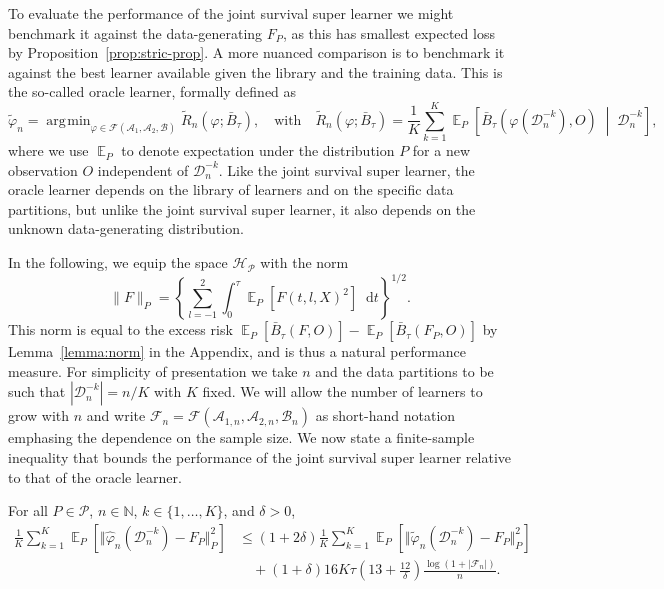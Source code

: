 \documentclass[lineno]{biometrika}
\DeclareMathOperator{\E}{\mathbb{E}} %
\newcommand{\N}{\mathbb{N}}
\renewcommand{\phi}{\varphi}
\newcommand*\diff{\mathop{}\!\mathrm{d}}
\newcommand{\midd}{\; \middle|\;}
\newcommand{\1}{\mathds{1}}
\DeclareMathOperator*{\argmin}{\arg\!\min}
\newcommand{\data}{\ensuremath{\mathcal{D}}}
\begin{document}
To evaluate the performance of the joint survival super learner we
might benchmark it against the data-generating \( F_P \), as this has
smallest expected loss by Proposition~\ref{prop:stric-prop}. A more
nuanced comparison is to benchmark it against the best learner
available given the library and the training data. This is the
so-called oracle learner, formally defined as
\begin{equation*}
  \tilde{\phi}_n
  =  \argmin_{\phi \in \mathcal{F}(\mathcal{A}_1, \mathcal{A}_2, \mathcal{B}) }
  \tilde{R}_{n}(\phi ; \bar{B}_{\tau}),
  \quad \text{with} \quad 
  \tilde{R}_n(\phi; \bar{B}_{\tau})=
  \frac{1}{K}\sum_{k=1}^{K} 
  \E_P{
    \left[
      \bar{B}_{\tau}
      {
        \left(
          \phi{ (\data_n^{-k})}
          , O
        \right)
      } 
      \midd  \data_n^{-k}
    \right]}
  ,
\end{equation*}
where %
we use \( \E_P \) to denote expectation under the distribution \( P \)
for a new observation \( O \) independent of \( \data_n^{-k} \). Like
the joint survival super learner, the oracle learner depends on the library of learners and on the
specific data partitions, but unlike the joint survival super learner, it also depends on the
unknown data-generating distribution.

In the following, we equip the space \( \mathcal{H}_{\mathcal{P}} \)
with the norm
\begin{equation}
  \label{eq:norm}
  \| F \|_{P} = 
  \left\{
    \sum_{l=-1}^{2}
    \int_0^{\tau} \E_P{\left[ F(t, l, X)^2 \right]} \diff t
  \right\}^{1/2}.
\end{equation}
This norm is equal to the excess risk
\( \E_P{[\bar{B}_\tau(F, O)]} - \E_P{[\bar{B}_\tau(F_P, O)]} \) by
Lemma~\ref{lemma:norm} in the Appendix, and is thus a natural
performance measure. For simplicity of presentation we take \( n \)
and the data partitions to be such that \( |\data_n^{-k}| = n/K \)
with \( K \) fixed. We will allow the number of learners to grow with
\( n \) and write
\( \mathcal{F}_n=\mathcal{F}(\mathcal{A}_{1,n}, \mathcal{A}_{2,n},
\mathcal{B}_n)\) as short-hand notation emphasing the dependence on
the sample size.  We now state a finite-sample inequality that bounds
the performance of the joint survival super learner relative to that of the oracle learner.

\begin{proposition}
  \label{prop:oracle-prop}
  For all \(P\in\mathcal{P}\), \( n \in \N \), \( k \in \{1, \dots, K\} \),
  and $\delta>0$,
  \begin{align*}
    \frac{1}{K}\sum_{k=1}^{K} \E_{P}{\left[ \Vert \hat{\phi}_n(\data_n^{-k}) - F_P \Vert_{P}^2 \right]}
    & \leq (1 + 2\delta)
      \frac{1}{K}\sum_{k=1}^{K} \E_{P}{\left[ \Vert \tilde{\phi}_n(\data_n^{-k}) - F_P \Vert_{P}^2 \right]}
    \\
    & \quad
      + (1+ \delta) 16   K \tau
      \left(
      13 + \frac{12}{\delta}
      \right)
      \frac{\log(1 + |\mathcal{F}_n|)}{n}.
  \end{align*}
\end{proposition}
\end{document}

